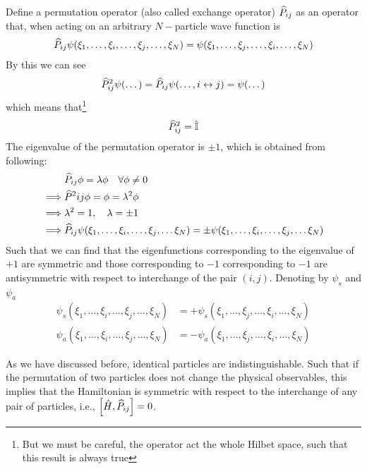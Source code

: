 Define a permutation operator (also called exchange operator) $\widehat{P}_{ij}$ as an operator that, when acting on an arbitrary $N-$particle wave function is 
\begin{align}
    \widehat{P}_{ij} \psi(\xi_1,\dots,\xi_i,\dots,\xi_j,\dots,\xi_N) = \psi(\xi_1,\dots,\xi_j,\dots,\xi_i,\dots,\xi_N)
\end{align}
By this we can see
\begin{align}
    \widehat{P}_{ij}^2 \psi(\dots) = \widehat{P}_{ij} \psi(\dots, i \leftrightarrow j) = \psi(\dots)
\end{align}
which means that\footnote{But we must be careful, the operator act the whole Hilbet space, such that this result is always true }
\begin{align}
    \widehat{P}^2_{ij} = \hat{\mathbb{I}} 
\end{align}
The eigenvalue of the permutation operator is $\pm 1$, which is obtained from following:
\begin{align*}
    &\widehat{P}_{ij} \phi = \lambda \phi \quad \forall \phi \neq 0 \\
   \implies& \widehat{P}^2{ij} \phi = \phi = \lambda^2 \phi  \\
    \implies & \lambda^2 = 1 , \quad \lambda = \pm1 \\
    \implies &\widehat{P}_{ij} \psi(\xi_1,\dots,\xi_i,\dots,\xi_j,\dots \xi_N) = \pm \psi(\xi_1,\dots,\xi_i,\dots,\xi_j,\dots \xi_N)
\end{align*}
Such that we can find that the eigenfunctions corresponding to the eigenvalue of $+1$ are symmetric and those corresponding to $-1$ corresponding to $-1$ are antisymmetric with respect to interchange of the pair $(i,j)$. Denoting by $\psi_{s} $ and $\psi_a$
\begin{align}
    \psi_s (\xi_1,\dots,\xi_i,\dots,\xi_j,\dots,\xi_N) &= + \psi_s (\xi_1,\dots,\xi_j,\dots,\xi_i,\dots,\xi_N) \\
    \psi_a (\xi_1,\dots,\xi_i,\dots,\xi_j,\dots,\xi_N) &= - \psi_a (\xi_1,\dots,\xi_j,\dots,\xi_i,\dots,\xi_N)
\end{align}

As we have discussed before,  identical particles are indistinguishable. Such that if the permutation of two particles does not change the physical observables, this implies that the Hamiltonian is symmetric with respect to the interchange of any pair of particles, i.e., $\left[ \hat{H} , \widehat{P}_{ij} \right] = 0$.

